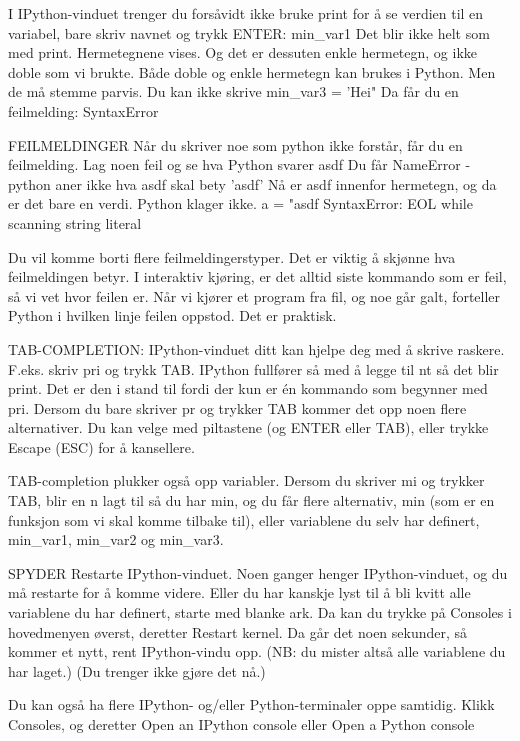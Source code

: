 I IPython-vinduet trenger du forsåvidt ikke bruke print for å se verdien
til en variabel, bare skriv navnet og trykk ENTER: 
min_var1
Det blir ikke helt som med print. Hermetegnene vises.
Og det er dessuten enkle hermetegn, og ikke doble som vi brukte.
Både doble og enkle hermetegn kan brukes i Python. 
Men de må stemme parvis. Du kan ikke skrive
min_var3 = 'Hei"
Da får du en feilmelding: SyntaxError 



FEILMELDINGER
Når du skriver noe som python ikke forstår, får du en feilmelding. 
Lag noen feil og se hva Python svarer
asdf
Du får NameError - python aner ikke hva asdf skal bety 
'asdf'
Nå er asdf innenfor hermetegn, og da er det bare en verdi. Python klager ikke.
a = "asdf
SyntaxError: EOL while scanning string literal

Du vil komme borti flere feilmeldingerstyper. 
Det er viktig å skjønne hva feilmeldingen betyr.  
I interaktiv kjøring, er det alltid siste kommando som er feil, så vi vet hvor feilen er. 
Når vi kjører et program fra fil, og noe går galt, forteller Python i hvilken linje
feilen oppstod. Det er praktisk. 


TAB-COMPLETION: 
IPython-vinduet ditt kan hjelpe deg med å skrive raskere.
F.eks. skriv pri og trykk TAB. IPython fullfører så med å legge til nt så det blir print.
Det er den i stand til fordi der kun er én kommando som begynner med pri.
Dersom du bare skriver pr og trykker TAB kommer det opp noen flere alternativer.
Du kan velge med piltastene (og ENTER eller TAB), eller trykke Escape (ESC) for å kansellere.

TAB-completion plukker også opp variabler.
Dersom du skriver mi og trykker TAB, blir en n lagt til så du har min,
og du får flere alternativ, min (som er en funksjon som vi skal komme tilbake til),
eller variablene du selv har definert, min_var1, min_var2 og min_var3.






SPYDER
Restarte IPython-vinduet.
Noen ganger henger IPython-vinduet, og du må restarte for å komme videre.
Eller du har kanskje lyst til å bli kvitt alle variablene du har definert,
starte med blanke ark. 
Da kan du trykke på Consoles i hovedmenyen øverst, deretter Restart kernel. 
Da går det noen sekunder, så kommer et nytt, rent IPython-vindu opp.
(NB: du mister altså alle variablene du har laget.) 
(Du trenger ikke gjøre det nå.)

Du kan også ha flere IPython- og/eller Python-terminaler oppe samtidig.
Klikk Consoles, og deretter 
Open an IPython console
eller 
Open a Python console


